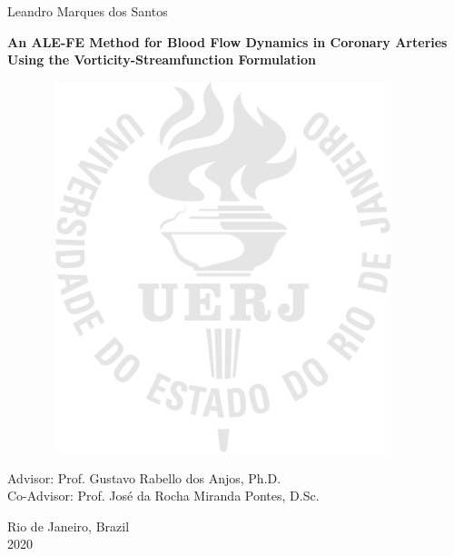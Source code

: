 \begin{center}

{\large Leandro Marques dos Santos}

\vspace{2cm}

\textbf{\LARGE 
An ALE-FE Method for Blood Flow Dynamics in Coronary Arteries Using the Vorticity-Streamfunction Formulation}

\vspace{1.0cm}

\begin{figure}[hbt!]
\begin{center}
\includegraphics[width=10.48cm,height=10.8cm]{logos/logo_uerj_mark}
\end{center}
\end{figure}

\vspace{-9cm}
\begin{flushright}
\parbox{8cm}{
}
\end{flushright}

\vspace{4.0cm}

{\large Advisor: Prof. Gustavo Rabello dos Anjos, Ph.D.\\
        Co-Advisor: Prof. José da Rocha Miranda Pontes, D.Sc.}\\

\par\vfill

{\large Rio de Janeiro, Brazil\\2020}

\end{center}
